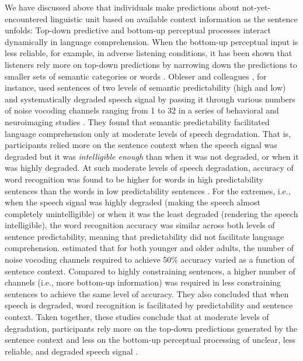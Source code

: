 \documentclass[a4paper, nobind]{templates/ociamthesis}
\begin{document}
We have discussed above that individuals make predictions about not-yet-encountered linguistic unit based on available context information as the sentence unfolds:
Top-down predictive and bottom-up perceptual processes interact dynamically in language comprehension.
When the bottom-up perceptual input is less reliable, for example, in adverse listening conditions, it has been shown that listeners rely more on top-down predictions by narrowing down the predictions to smaller sets of semantic categories or words \autocites[e.g.,][]{Strauss2013}[see also,][]{Corps2020}.
Obleser and colleagues \autocite{Obleser2007,Obleser2010,Obleser2011}, for instance, used sentences of two levels of semantic predictability (high and low) and systematically degraded speech signal by passing it through various numbers of noise vocoding channels ranging from 1 to 32 in a series of behavioral and neuroimaging studies \autocite[see also,][]{Hunter2018}.
They found that semantic predictability facilitated language comprehension only at moderate levels of speech degradation.
That is, participants relied more on the sentence context when the speech signal was degraded but it was \emph{intelligible enough} than when it was not degraded, or when it was highly degraded.
At such moderate levels of speech degradation, accuracy of word recognition was found to be higher for words in high predictability sentences than the words in low predictability sentences \autocite{Obleser2010}.
For the extremes, i.e., when the speech signal was highly degraded (making the speech almost completely unintelligible) or when it was the least degraded (rendering the speech intelligible),
the word recognition accuracy was similar across both levels of sentence predictability, meaning that predictability did not facilitate language comprehension.
\textcite{Sheldon2008b} estimated that for both younger and older adults, the number of noise vocoding channels required to achieve 50\% accuracy varied as a function of sentence context.
Compared to highly constraining sentences, a higher number of channels (i.e., more bottom-up information) was required in less constraining sentences to achieve the same level of accuracy.
They also concluded that when speech is degraded, word recognition is facilitated by predictability and sentence context.
Taken together, these studies conclude that at moderate levels of degradation, participants rely more on the top-down predictions generated by the sentence context and less on the bottom-up perceptual processing of unclear, less reliable, and degraded speech signal \autocite{Obleser2014}.
\end{document}
